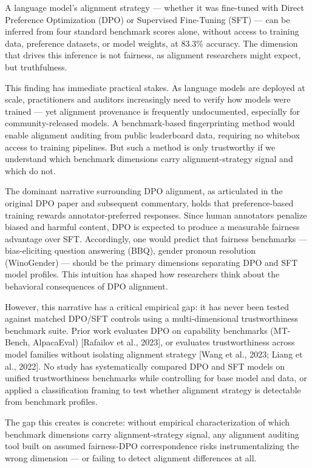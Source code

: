 
A language model's alignment strategy --- whether it was fine-tuned with Direct Preference
Optimization (DPO) or Supervised Fine-Tuning (SFT) --- can be inferred from four standard
benchmark scores alone, without access to training data, preference datasets, or model
weights, at 83.3\% accuracy. The dimension that drives this inference is not fairness,
as alignment researchers might expect, but truthfulness.

This finding has immediate practical stakes. As language models are deployed at scale,
practitioners and auditors increasingly need to verify how models were trained --- yet
alignment provenance is frequently undocumented, especially for community-released models.
A benchmark-based fingerprinting method would enable alignment auditing from public
leaderboard data, requiring no whitebox access to training pipelines. But such a method
is only trustworthy if we understand which benchmark dimensions carry alignment-strategy
signal and which do not.

The dominant narrative surrounding DPO alignment, as articulated in the original DPO
paper \citep{Rafailov2023Direct} and subsequent commentary, holds that preference-based
training rewards annotator-preferred responses. Since human annotators penalize biased
and harmful content, DPO is expected to produce a measurable fairness advantage over
SFT. Accordingly, one would predict that fairness benchmarks --- bias-eliciting question
answering (BBQ), gender pronoun resolution (WinoGender) --- should be the primary
dimensions separating DPO and SFT model profiles. This intuition has shaped how
researchers think about the behavioral consequences of DPO alignment.

However, this narrative has a critical empirical gap: it has never been tested against
matched DPO/SFT controls using a multi-dimensional trustworthiness benchmark suite.
Prior work evaluates DPO on capability benchmarks (MT-Bench, AlpacaEval) [Rafailov et al.,
2023], or evaluates trustworthiness across model families without isolating alignment
strategy [Wang et al., 2023; Liang et al., 2022]. No study has systematically compared
DPO and SFT models on unified trustworthiness benchmarks while controlling for base
model and data, or applied a classification framing to test whether alignment strategy
is detectable from benchmark profiles.

The gap this creates is concrete: without empirical characterization of which benchmark
dimensions carry alignment-strategy signal, any alignment auditing tool built on assumed
fairness-DPO correspondence risks instrumentalizing the wrong dimension --- or failing
to detect alignment differences at all.

